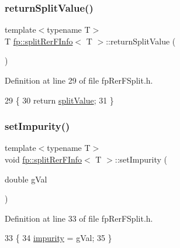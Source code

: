 \subsubsection{\texorpdfstring{return\+Split\+Value()}{returnSplitValue()}}
{\footnotesize\ttfamily template$<$typename T$>$ \\
T \hyperlink{classfp_1_1splitRerFInfo}{fp\+::split\+Rer\+F\+Info}$<$ T $>$\+::return\+Split\+Value (\begin{DoxyParamCaption}{ }\end{DoxyParamCaption})\hspace{0.3cm}{\ttfamily [inline]}}



Definition at line 29 of file fp\+Rer\+F\+Split.\+h.


\begin{DoxyCode}
29                                            \{
30                     \textcolor{keywordflow}{return} \hyperlink{classfp_1_1splitRerFInfo_a9bdbbaacd0da790fa938a0f5176890bc}{splitValue};
31                 \}
\end{DoxyCode}
\mbox{\label{classfp_1_1splitRerFInfo_ac1ad89a7c7cbc2bd8f7ffb3aa523b1eb}} 
\subsubsection{\texorpdfstring{set\+Impurity()}{setImpurity()}}
{\footnotesize\ttfamily template$<$typename T$>$ \\
void \hyperlink{classfp_1_1splitRerFInfo}{fp\+::split\+Rer\+F\+Info}$<$ T $>$\+::set\+Impurity (\begin{DoxyParamCaption}\item[{double}]{g\+Val }\end{DoxyParamCaption})\hspace{0.3cm}{\ttfamily [inline]}}



Definition at line 33 of file fp\+Rer\+F\+Split.\+h.


\begin{DoxyCode}
33                                                     \{
34                     \hyperlink{classfp_1_1splitRerFInfo_a37516896816870be54ff20a713dc4bd3}{impurity} = gVal;
35                 \}
\end{DoxyCode}
\mbox{\label{classfp_1_1splitRerFInfo_af7409ccd3d123780aa9e6b3fe24df589}} 
